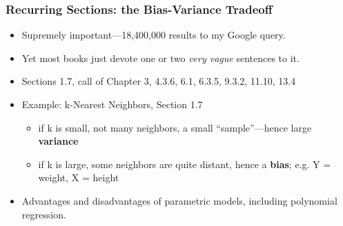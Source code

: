 \documentclass{beamer}
\begin{document}
\begin{frame} 
\frametitle{Recurring Sections: the Bias-Variance Tradeoff}%

\begin{itemize}

\item Supremely important---18,400,000 results to my Google query.

\item Yet most books just devote one or two \textit{very vague}
sentences to it.

\item Sections 1.7, call of Chapter 3, 4.3.6, 6.1, 6.3.5, 9.3.2, 11.10, 13.4

\item Example: k-Nearest Neighbors, Section 1.7

\begin{itemize}

\item if k is small, not many neighbors, a small ``sample''---hence large
\textbf{variance} 

\item if k is large, some neighbors are quite distant,
hence a \textbf{bias}; e.g. Y = weight, X = height

\end{itemize} 

\item Advantages and disadvantages of parametric models, including
polynomial regression.

\end{itemize} 

\end{frame} 
\end{document}

